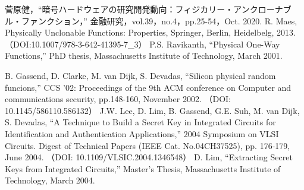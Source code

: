 \documentclass[technicalreport]{ieicej} %
\begin{document}
%
%
\begin{thebibliography}{99}%
  菅原健，“暗号ハードウェアの研究開発動向：フィジカリー・アンクローナブル・ファンクション，”
  金融研究，vol.39，no.4，pp.25-54，Oct. 2020.
  R. Maes, Physically Unclonable Functions: Properties, Springer, Berlin, Heidelbelg, 2013.
  （DOI:10.1007/978-3-642-41395-7\_3）
  P.S. Ravikanth, “Physical One-Way Functions,” PhD thesis,
  Massachusetts Institute of Technology, March 2001.

  B. Gassend, D. Clarke, M. van Dijk, S. Devadas, “Silicon physical random funcions,”
  CCS '02: Proceedings of the 9th ACM conference on Computer and communications security,
  pp.148-160, November 2002. （DOI: 10.1145/586110.586132）
  J.W. Lee, D. Lim, B. Gassend, G.E. Suh, M. van Dijk, S. Devadas,
  “A Technique to Build a Secret Key in Integrated Circuits for Identification and Authentication Applications,”
  2004 Symposium on VLSI Circuits. Digest of Technical Papers (IEEE Cat. No.04CH37525),
  pp. 176-179, June 2004. （DOI: 10.1109/VLSIC.2004.1346548）
  D. Lim, “Extracting Secret Keys from Integrated Circuits,” Master's Thesis,
  Massachusetts Institute of Technology, March 2004.

\end{thebibliography}


\end{document}
